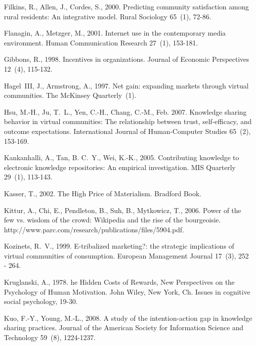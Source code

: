 \documentclass[doublespacing]{elsarticle}
\begin{document}
\begin{thebibliography}{52}
Filkins, R., Allen, J., Cordes, S., 2000. {Predicting community satisfaction
  among rural residents: An integrative model}. Rural Sociology 65~(1), 72-86.

Flanagin, A., Metzger, M., 2001. {Internet use in the contemporary media
  environment}. Human Communication Research 27~(1), 153-181.

Gibbons, R., 1998. Incentives in organizations. Journal of Economic
  Perspectives 12~(4), 115-132.

Hagel~III, J., Armstrong, A., 1997. {Net gain: expanding markets through
  virtual communities}. The McKinsey Quarterly~(1).

Hsu, M.-H., Ju, T.~L., Yen, C.-H., Chang, C.-M., Feb. 2007. Knowledge sharing
  behavior in virtual communities: The relationship between trust,
  self-efficacy, and outcome expectations. International Journal of
  Human-Computer Studies 65~(2), 153-169.

Kankanhalli, A., Tan, B. C.~Y., Wei, K.-K., 2005. Contributing knowledge to
  electronic knowledge repositories: An empirical investigation. MIS Quarterly
  29~(1), 113-143.

Kasser, T., 2002. The High Price of Materialism. Bradford Book.

Kittur, A., Chi, E., Pendleton, B., Suh, B., Mytkowicz, T., 2006. Power of the
  few vs. wisdom of the crowd: Wikipedia and the rise of the bourgeoisie.
  http://www.parc.com/research/publications/files/5904.pdf.

Kozinets, R.~V., 1999. E-tribalized marketing?: the strategic implications of
  virtual communities of consumption. European Management Journal 17~(3), 252
  - 264.

Kruglanski, A., 1978. he Hidden Costs of Rewards, New Perspectives on the
  Psychology of Human Motivation. John Wiley, New York, Ch. Issues in cognitive
  social psychology,  19-30.

Kuo, F.-Y., Young, M.-L., 2008. A study of the intention-action gap in
  knowledge sharing practices. Journal of the American Society for Information
  Science and Technology 59~(8), 1224-1237.



\end{thebibliography}
\end{document}
